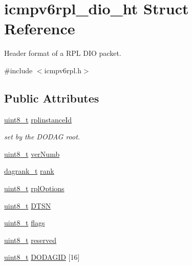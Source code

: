 \hypertarget{structicmpv6rpl__dio__ht}{}\section{icmpv6rpl\+\_\+dio\+\_\+ht Struct Reference}
\label{structicmpv6rpl__dio__ht}


Header format of a R\+PL D\+IO packet.  




{\ttfamily \#include $<$icmpv6rpl.\+h$>$}

\subsection*{Public Attributes}
\begin{DoxyCompactItemize}
\item 
\hyperlink{_p_e___types_8h_aba7bc1797add20fe3efdf37ced1182c5}{uint8\+\_\+t} \hyperlink{structicmpv6rpl__dio__ht_a00ec0515587fab9425046498de9924bc}{rplinstance\+Id}
\begin{DoxyCompactList}\small\item\em set by the D\+O\+D\+AG root. \end{DoxyCompactList}\item 
\hyperlink{_p_e___types_8h_aba7bc1797add20fe3efdf37ced1182c5}{uint8\+\_\+t} \hyperlink{structicmpv6rpl__dio__ht_a11848f02262ef3eab4ae9fded4efff6e}{ver\+Numb}
\item 
\hyperlink{opendefs_8h_a502861d0bb432f5702761bd854023e21}{dagrank\+\_\+t} \hyperlink{structicmpv6rpl__dio__ht_a06c8c645055fefe26b675d9e4c1c1566}{rank}
\item 
\hyperlink{_p_e___types_8h_aba7bc1797add20fe3efdf37ced1182c5}{uint8\+\_\+t} \hyperlink{structicmpv6rpl__dio__ht_a1ba62f69dca7f85acc32147a9646f403}{rpl\+Options}
\item 
\hyperlink{_p_e___types_8h_aba7bc1797add20fe3efdf37ced1182c5}{uint8\+\_\+t} \hyperlink{structicmpv6rpl__dio__ht_ae51455dabdffd16970fc4c686e61b5a5}{D\+T\+SN}
\item 
\hyperlink{_p_e___types_8h_aba7bc1797add20fe3efdf37ced1182c5}{uint8\+\_\+t} \hyperlink{structicmpv6rpl__dio__ht_ad33b242f22ab4a32610a156978733da8}{flags}
\item 
\hyperlink{_p_e___types_8h_aba7bc1797add20fe3efdf37ced1182c5}{uint8\+\_\+t} \hyperlink{structicmpv6rpl__dio__ht_af85e57d60eb429c93011d35faf0581d2}{reserved}
\item 
\hyperlink{_p_e___types_8h_aba7bc1797add20fe3efdf37ced1182c5}{uint8\+\_\+t} \hyperlink{structicmpv6rpl__dio__ht_a486b0c1d41a2c3fdc213c88e2e31ee39}{D\+O\+D\+A\+G\+ID} \mbox{[}16\mbox{]}
\end{DoxyCompactItemize}


